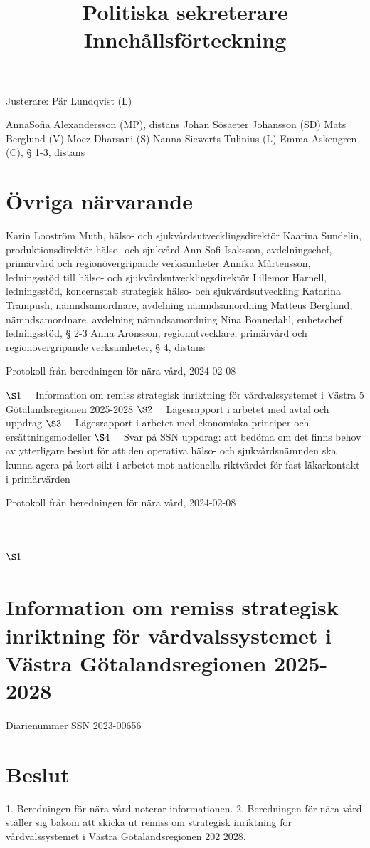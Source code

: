 Justerare:
Pär Lundqvist (L)

\title{
Politiska sekreterare
}
AnnaSofia Alexandersson (MP), distans
Johan Sösaeter Johansson (SD)
Mats Berglund (V)
Moez Dharsani (S)
Nanna Siewerts Tulinius (L)
Emma Askengren (C), § 1-3, distans
\section*{Övriga närvarande}
Karin Looström Muth, hälso- och sjukvårdsutvecklingsdirektör
Kaarina Sundelin, produktionsdirektör hälso- och sjukvård
Ann-Sofi Isaksson, avdelningschef, primärvård och regionövergripande
verksamheter
Annika Mårtensson, ledningsstöd till hälso- och sjukvårdsutvecklingsdirektör
Lillemor Harnell, ledningsstöd, koncernstab strategisk hälso- och
sjukvårdsutveckling
Katarina Trampush, nämndsamordnare, avdelning nämndsamordning
Matteus Berglund, nämndsamordnare, avdelning nämndsamordning
Nina Bonnedahl, enhetschef ledningsstöd, § 2-3
Anna Aronsson, regionutvecklare, primärvård och regionövergripande
verksamheter, § 4, distans

Protokoll från beredningen för nära vård, 2024-02-08
\title{
Innehållsförteckning
}
\(\S 1 \quad\) Information om remiss strategisk inriktning för vårdvalssystemet i Västra 5
Götalandsregionen 2025-2028
\(\S 2 \quad\) Lägesrapport i arbetet med avtal och uppdrag
\(\S 3 \quad\) Lägesrapport i arbetet med ekonomiska principer och ersättningsmodeller
\(\S 4 \quad\) Svar på SSN uppdrag: att bedöma om det finns behov av ytterligare beslut för att den operativa hälso- och sjukvårdsnämnden ska kunna agera på kort sikt i arbetet mot nationella riktvärdet för fast läkarkontakt i primärvärden

Protokoll från beredningen för nära vård, 2024-02-08
\section*{\(\S 1\)}
\section*{Information om remiss strategisk inriktning för vårdvalssystemet i Västra Götalandsregionen 2025-2028}
Diarienummer SSN 2023-00656
\section*{Beslut}
1. Beredningen för nära vård noterar informationen.
2. Beredningen för nära vård ställer sig bakom att skicka ut remiss om strategisk inriktning för vårdvalssystemet i Västra Götalandsregionen 202 2028.
